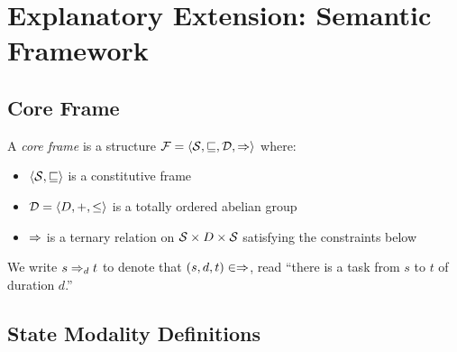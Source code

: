 \documentclass[../LogosReference.tex]{subfiles}
\begin{document}

\section{Explanatory Extension: Semantic Framework}\label{sec:core-semantics}


\subsection{Core Frame}\label{sec:core-frame}

\begin{definition}\label{def:core-frame}
	A \emph{core frame} is a structure $\mathcal{F} = \langle \mathcal{S}, \sqsubseteq, \mathcal{D}, \Rightarrow \rangle$ where:
	\begin{itemize}
		\item $\langle \mathcal{S}, \sqsubseteq \rangle$ is a constitutive frame
		\item $\mathcal{D} = \langle D, +, \leq \rangle$ is a totally ordered abelian group
		\item $\Rightarrow$ is a ternary relation on $\mathcal{S} \times D \times \mathcal{S}$ satisfying the constraints below
	\end{itemize}
\end{definition}

\begin{notation}
	We write $s \Rightarrow_{d} t$ to denote that $(s, d, t) \in \Rightarrow$, read ``there is a task from $s$ to $t$ of duration $d$.''
\end{notation}


\subsection{State Modality Definitions}\label{sec:state-modality}
\end{document}
